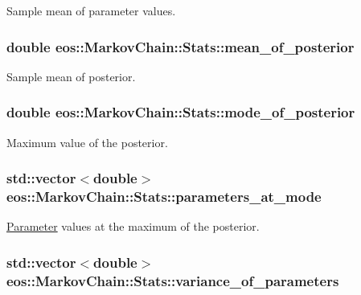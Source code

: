 Sample mean of parameter values. \hypertarget{structeos_1_1MarkovChain_1_1Stats_aa1f42fd0080e7dc2e2edcc8f97f78c46}{
\subsubsection[{mean\_\-of\_\-posterior}]{\setlength{\rightskip}{0pt plus 5cm}double {\bf eos::MarkovChain::Stats::mean\_\-of\_\-posterior}}}
\label{structeos_1_1MarkovChain_1_1Stats_aa1f42fd0080e7dc2e2edcc8f97f78c46}


Sample mean of posterior. \hypertarget{structeos_1_1MarkovChain_1_1Stats_aead4abcd766affbdbb602d906b4938f6}{
\subsubsection[{mode\_\-of\_\-posterior}]{\setlength{\rightskip}{0pt plus 5cm}double {\bf eos::MarkovChain::Stats::mode\_\-of\_\-posterior}}}
\label{structeos_1_1MarkovChain_1_1Stats_aead4abcd766affbdbb602d906b4938f6}


Maximum value of the posterior. \hypertarget{structeos_1_1MarkovChain_1_1Stats_a9000c8ee4f560120fcc5bec1c615e7b0}{
\subsubsection[{parameters\_\-at\_\-mode}]{\setlength{\rightskip}{0pt plus 5cm}std::vector$<$double$>$ {\bf eos::MarkovChain::Stats::parameters\_\-at\_\-mode}}}
\label{structeos_1_1MarkovChain_1_1Stats_a9000c8ee4f560120fcc5bec1c615e7b0}


\hyperlink{classeos_1_1Parameter}{Parameter} values at the maximum of the posterior. \hypertarget{structeos_1_1MarkovChain_1_1Stats_ad97dc1a916cfe3905ae776804ec57106}{
\subsubsection[{variance\_\-of\_\-parameters}]{\setlength{\rightskip}{0pt plus 5cm}std::vector$<$double$>$ {\bf eos::MarkovChain::Stats::variance\_\-of\_\-parameters}}}
\label{structeos_1_1MarkovChain_1_1Stats_ad97dc1a916cfe3905ae776804ec57106}


